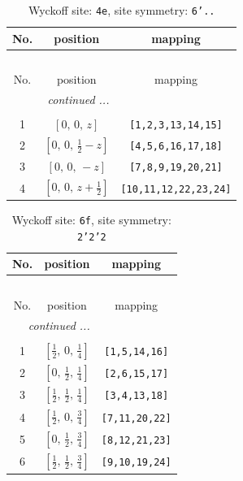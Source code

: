 \documentclass[fleqn,8pt]{jsarticle}
\begin{document}
\renewcommand{\arraystretch}{1.2}
\begin{longtable}{ccc}
\caption{Wyckoff site: {\tt 4e}, site symmetry: {\tt 6'..}}
 \\
 \hline \hline
No. & position & mapping \\ \hline \endfirsthead

\multicolumn{2}{l}{\tablename\ \thetable{}} \\
 \hline \hline
No. & position & mapping \\ \hline \endhead

 \hline \hline
\multicolumn{2}{r}{\footnotesize\it continued ...} \\ \endfoot

 \hline \hline
\multicolumn{2}{r}{} \\ \endlastfoot

1 & $\left[ 0,\, 0,\, z \right]$ & {\tt [1,2,3,13,14,15]} \\ \hline
2 & $\left[ 0,\, 0,\, \frac{1}{2} - z \right]$ & {\tt [4,5,6,16,17,18]} \\ \hline
3 & $\left[ 0,\, 0,\, - z \right]$ & {\tt [7,8,9,19,20,21]} \\ \hline
4 & $\left[ 0,\, 0,\, z + \frac{1}{2} \right]$ & {\tt [10,11,12,22,23,24]} \\
\end{longtable}
\renewcommand{\arraystretch}{1.2}
\begin{longtable}{ccc}
\caption{Wyckoff site: {\tt 6f}, site symmetry: {\tt 2'2'2}}
 \\
 \hline \hline
No. & position & mapping \\ \hline \endfirsthead

\multicolumn{2}{l}{\tablename\ \thetable{}} \\
 \hline \hline
No. & position & mapping \\ \hline \endhead

 \hline \hline
\multicolumn{2}{r}{\footnotesize\it continued ...} \\ \endfoot

 \hline \hline
\multicolumn{2}{r}{} \\ \endlastfoot

1 & $\left[ \frac{1}{2},\, 0,\, \frac{1}{4} \right]$ & {\tt [1,5,14,16]} \\ \hline
2 & $\left[ 0,\, \frac{1}{2},\, \frac{1}{4} \right]$ & {\tt [2,6,15,17]} \\ \hline
3 & $\left[ \frac{1}{2},\, \frac{1}{2},\, \frac{1}{4} \right]$ & {\tt [3,4,13,18]} \\ \hline
4 & $\left[ \frac{1}{2},\, 0,\, \frac{3}{4} \right]$ & {\tt [7,11,20,22]} \\ \hline
5 & $\left[ 0,\, \frac{1}{2},\, \frac{3}{4} \right]$ & {\tt [8,12,21,23]} \\ \hline
6 & $\left[ \frac{1}{2},\, \frac{1}{2},\, \frac{3}{4} \right]$ & {\tt [9,10,19,24]} \\
\end{longtable}
\end{document}
